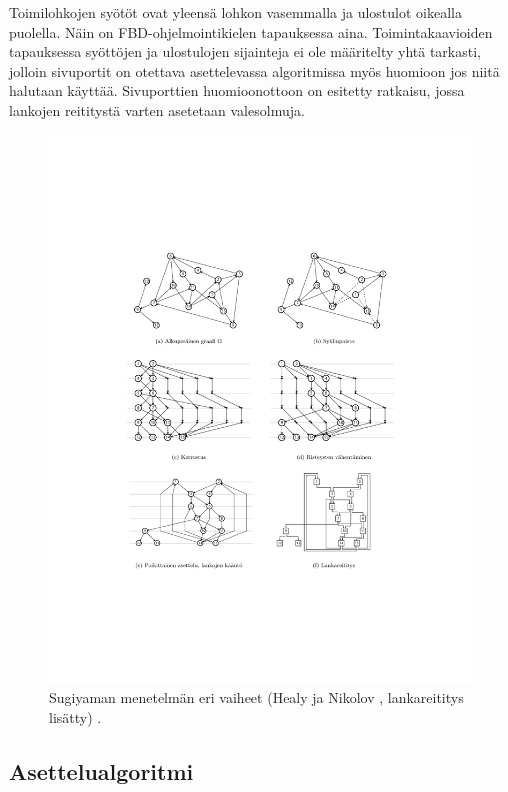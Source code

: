 \documentclass[finnish,12pt]{article}
\begin{document}
Toimilohkojen syötöt ovat yleensä lohkon vasemmalla ja ulostulot oikealla puolella.
Näin on FBD-ohjelmointikielen tapauksessa aina. %
Toimintakaavioiden tapauksessa syöttöjen ja ulostulojen sijainteja ei ole määritelty yhtä tarkasti, jolloin sivuportit on otettava asettelevassa algoritmissa myös huomioon jos niitä halutaan käyttää.
Sivuporttien huomioonottoon on esitetty ratkaisu, jossa lankojen reititystä varten asetetaan valesolmuja. \cite{RefWorks:51}


\begin{figure}[!p]
\centering
\includegraphics[width=\textwidth]{hier.pdf}
\caption{Sugiyaman menetelmän eri vaiheet (Healy ja Nikolov \cite{RefWorks:70}, lankareititys lisätty) . }
\end{figure}

		\subsection{Asettelualgoritmi}
\end{document}

